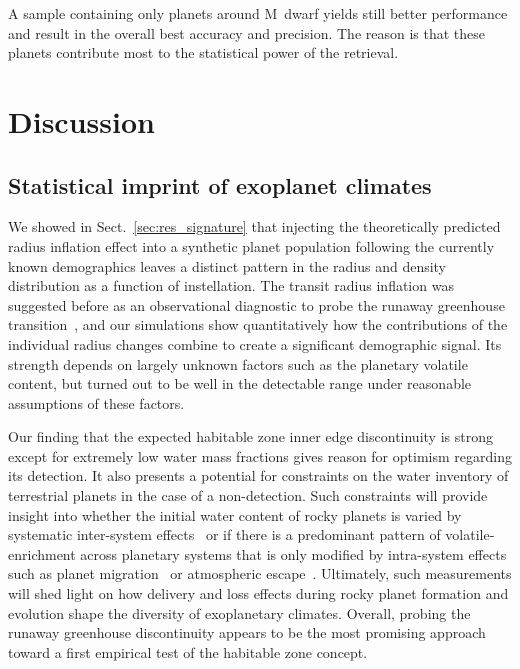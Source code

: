 \documentclass[twocolumn,twocolappendix]{aastex631}
\begin{document}
A sample containing only planets around M~dwarf yields still better performance and result in the overall best accuracy and precision.
The reason is that these planets contribute most to the statistical power of the retrieval.


\section{Discussion}\label{sec:discussion}

\subsection{Statistical imprint of exoplanet climates}
We showed in Sect.~\ref{sec:res_signature} that injecting the theoretically predicted radius inflation effect into a synthetic planet population following the currently known demographics leaves a distinct pattern in the radius and density distribution as a function of instellation.
The transit radius inflation was suggested before as an observational diagnostic to probe the runaway greenhouse transition~\citep{Turbet2019}, and our simulations show quantitatively how the contributions of the individual radius changes combine to create a significant demographic signal.
Its strength depends on largely unknown factors such as the planetary volatile content, but turned out to be well in the detectable range under reasonable assumptions of these factors.

Our finding that the expected habitable zone inner edge discontinuity is strong except for extremely low water mass fractions gives reason for optimism regarding its detection.
It also presents a potential for constraints on the water inventory of terrestrial planets in the case of a non-detection.
Such constraints will provide insight into whether the initial water content of rocky planets is varied by systematic inter-system effects~\citep[e.g.,][]{Raymond2004,Mulders2015b,Sato2016,Lichtenberg2019,2021ApJ...913L..20L,2022ApJ...938L...3L} or if there is a predominant pattern of volatile-enrichment across planetary systems that is only modified by intra-system effects such as planet migration~\citep{Schlecker2021} or atmospheric escape~\citep{Owen2016}.
Ultimately, such measurements will shed light on how delivery and loss effects during rocky planet formation and evolution shape the diversity of exoplanetary climates.
Overall, probing the runaway greenhouse discontinuity appears to be the most promising approach toward a first empirical test of the habitable zone concept.
\end{document}
